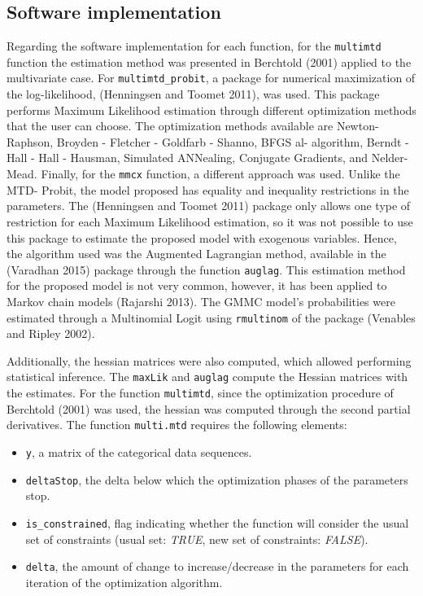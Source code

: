 \hypertarget{software-implementation}{%
\subsection{Software implementation}\label{software-implementation}}

Regarding the software implementation for each function, for the \texttt{multimtd} function the estimation method was presented in Berchtold (2001) applied to the multivariate case. For \texttt{multimtd\_probit}, a package for numerical maximization of the log-likelihood,  (Henningsen and Toomet 2011), was used. This package performs Maximum Likelihood estimation through different optimization methods that the user can choose. The optimization methods available are Newton-Raphson, Broyden - Fletcher - Goldfarb - Shanno, BFGS al- algorithm, Berndt - Hall - Hall - Hausman, Simulated ANNealing, Conjugate Gradients, and Nelder-Mead. Finally, for the \texttt{mmcx} function, a different approach was used. Unlike the MTD- Probit, the model proposed has equality and inequality restrictions in the parameters. The  (Henningsen and Toomet 2011) package only allows one type of restriction for each Maximum Likelihood estimation, so it was not possible to use this package to estimate the proposed model with exogenous variables. Hence, the algorithm used was the Augmented Lagrangian method, available in the  (Varadhan 2015) package through the function \texttt{auglag}. This estimation method for the proposed model is not very common, however, it has been applied to Markov chain models (Rajarshi 2013). The GMMC model's probabilities were estimated through a Multinomial Logit using \texttt{rmultinom} of the  package (Venables and Ripley 2002).

Additionally, the hessian matrices were also computed, which allowed performing statistical inference. The \texttt{maxLik} and \texttt{auglag} compute the Hessian matrices with the estimates. For the function \texttt{multimtd}, since the optimization procedure of Berchtold (2001) was used, the hessian was computed through the second partial derivatives. The function \texttt{multi.mtd} requires the following elements:

\begin{itemize}
\item
  \texttt{y}, a matrix of the categorical data sequences.
\item
  \texttt{deltaStop}, the delta below which the optimization phases of the parameters stop.
\item
  \texttt{is\_constrained}, flag indicating whether the function will consider the usual set of constraints (usual set: \textit{TRUE}, new set of constraints: \textit{FALSE}).
\item
  \texttt{delta}, the amount of change to increase/decrease in the parameters for each iteration of the optimization algorithm.
\end{itemize}

